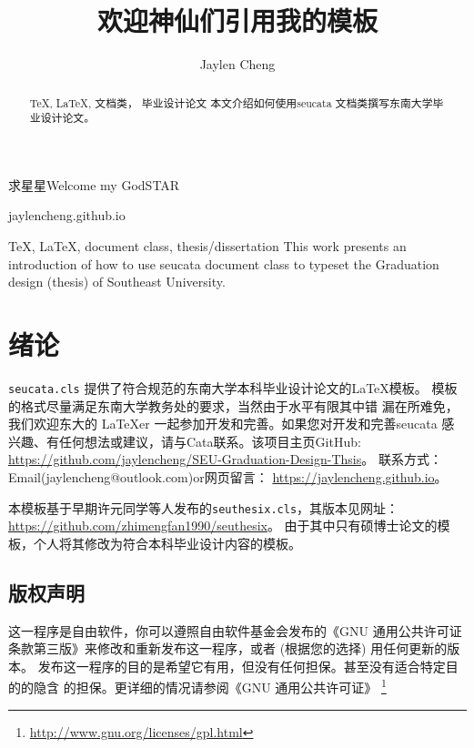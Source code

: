 \documentclass[openany,masters]{seucata}
\begin{document}
\title{欢迎神仙们引用我的模板}{求星星}{Welcome my God}{STAR}
\author{Jaylen Cheng}{jaylencheng.github.io}
\authorizedate{\today}
\makecover


\begin{abstract}{\TeX, \LaTeX, 文档类， 毕业设计论文}
本文介绍如何使用seucata 文档类撰写东南大学毕业设计论文。
\end{abstract}
\begin{englishabstract}{\TeX, \LaTeX, document class, thesis/dissertation}
This work presents an introduction of how to use seucata document class to 
typeset the Graduation design (thesis) of Southeast University.
\end{englishabstract}

\tableofcontents
\listofothers

\mainmatter


\chapter{绪论}
\verb+seucata.cls+ 提供了符合规范的东南大学本科毕业设计论文的\LaTeX 模板。
模板的格式尽量满足东南大学教务处的要求，当然由于水平有限其中错
漏在所难免，我们欢迎东大的 \LaTeX{er} 一起参加开发和完善。如果您对开发和完善seucata
感兴趣、有任何想法或建议，请与Cata联系。该项目主页GitHub:
\url{https://github.com/jaylencheng/SEU-Graduation-Design-Thsis}。
联系方式：Email(jaylencheng@outlook.com)or网页留言：
\url{https://jaylencheng.github.io}。

本模板基于早期许元同学等人发布的\verb+seuthesix.cls+，其版本见网址：
\url{https://github.com/zhimengfan1990/seuthesix}。
由于其中只有硕博士论文的模板，个人将其修改为符合本科毕业设计内容的模板。


\section{版权声明}

这一程序是自由软件，你可以遵照自由软件基金会发布的《GNU 通用公共许可证
条款第三版》来修改和重新发布这一程序，或者 (根据您的选择) 用任何更新的版本。
发布这一程序的目的是希望它有用，但没有任何担保。甚至没有适合特定目的的隐含
的担保。更详细的情况请参阅《GNU 通用公共许可证》
\footnote{\url{http://www.gnu.org/licenses/gpl.html}}
\end{document}
